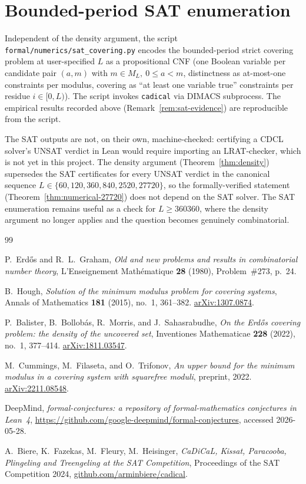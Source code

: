 \documentclass[11pt,a4paper]{article}
\theoremstyle{plain}
\theoremstyle{definition}
\theoremstyle{remark}
\begin{document}
\section{Bounded-period SAT enumeration}
\label{sec:sat}

Independent of the density argument, the script
\texttt{formal/numerics/sat\_covering.py} encodes the bounded-period
strict covering problem at user-specified $L$ as a propositional
CNF (one Boolean variable per candidate pair $(a, m)$ with $m \in
M_L,\ 0 \leq a < m$, distinctness as at-most-one constraints per
modulus, covering as ``at least one variable true'' constraints per
residue $i \in [0, L)$). The script invokes \texttt{cadical}
\cite{Biere2024CaDiCaL} via DIMACS subprocess. The empirical
results recorded above (Remark~\ref{rem:sat-evidence}) are
reproducible from the script.

The SAT outputs are not, on their own, machine-checked: certifying
a CDCL solver's UNSAT verdict in Lean would require importing an
LRAT-checker, which is not yet in this project. The density argument
(Theorem~\ref{thm:density}) supersedes the SAT certificates for
every UNSAT verdict in the canonical sequence $L \in \{60, 120,
360, 840, 2520, 27720\}$, so the formally-verified statement
(Theorem~\ref{thm:numerical-27720}) does not depend on the SAT
solver. The SAT enumeration remains useful as a check for
$L \geq 360360$, where the density argument no longer applies and
the question becomes genuinely combinatorial.

\begin{thebibliography}{99}

P.~Erdős and R.~L.~Graham,
\emph{Old and new problems and results in combinatorial number theory},
L'Enseignement Mathématique \textbf{28} (1980), Problem~\#273,
p.~24.

B.~Hough,
\emph{Solution of the minimum modulus problem for covering systems},
Annals of Mathematics \textbf{181} (2015), no.~1, 361--382.
\href{https://arxiv.org/abs/1307.0874}{arXiv:1307.0874}.

P.~Balister, B.~Bollobás, R.~Morris, and J.~Sahasrabudhe,
\emph{On the Erdős covering problem: the density of the uncovered set},
Inventiones Mathematicae \textbf{228} (2022), no.~1, 377--414.
\href{https://arxiv.org/abs/1811.03547}{arXiv:1811.03547}.

M.~Cummings, M.~Filaseta, and O.~Trifonov,
\emph{An upper bound for the minimum modulus in a covering system
with squarefree moduli},
preprint, 2022.
\href{https://arxiv.org/abs/2211.08548}{arXiv:2211.08548}.

DeepMind,
\emph{formal-conjectures: a repository of formal-mathematics
conjectures in Lean~4},
\url{https://github.com/google-deepmind/formal-conjectures},
accessed 2026-05-28.

A.~Biere, K.~Fazekas, M.~Fleury, M.~Heisinger,
\emph{CaDiCaL, Kissat, Paracooba, Plingeling and Treengeling at the SAT
Competition}, Proceedings of the SAT Competition 2024,
\href{https://github.com/arminbiere/cadical}{github.com/arminbiere/cadical}.

\end{thebibliography}
\end{document}
